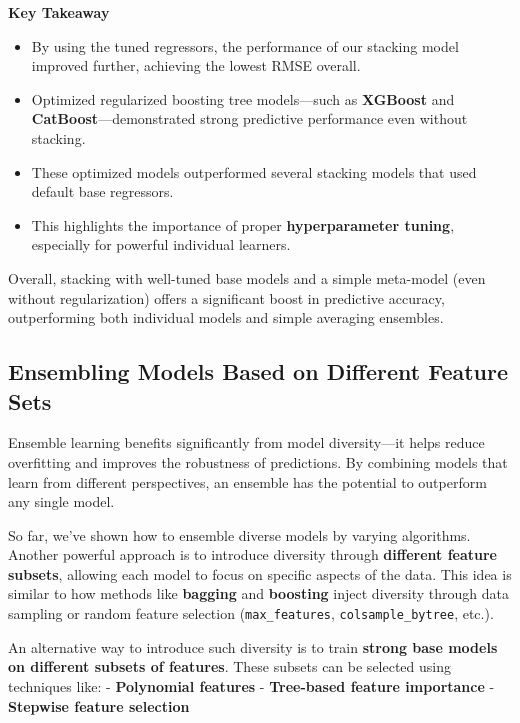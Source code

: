 \documentclass[
  letterpaper,
  DIV=11,
  numbers=noendperiod]{scrreprt}
\providecommand{\tightlist}{%
  \setlength{\itemsep}{0pt}\setlength{\parskip}{0pt}}\usepackage{longtable,booktabs,array}
\begin{document}
\textbf{Key Takeaway}

\begin{itemize}
\tightlist
\item
  By using the tuned regressors, the performance of our stacking model
  improved further, achieving the lowest RMSE overall.
\item
  Optimized regularized boosting tree models---such as \textbf{XGBoost}
  and \textbf{CatBoost}---demonstrated strong predictive performance
  even without stacking.
\item
  These optimized models outperformed several stacking models that used
  default base regressors.
\item
  This highlights the importance of proper \textbf{hyperparameter
  tuning}, especially for powerful individual learners.
\end{itemize}

Overall, stacking with well-tuned base models and a simple meta-model
(even without regularization) offers a significant boost in predictive
accuracy, outperforming both individual models and simple averaging
ensembles.

\subsection{Ensembling Models Based on Different Feature
Sets}\label{ensembling-models-based-on-different-feature-sets}

Ensemble learning benefits significantly from model diversity---it helps
reduce overfitting and improves the robustness of predictions. By
combining models that learn from different perspectives, an ensemble has
the potential to outperform any single model.

So far, we've shown how to ensemble diverse models by varying
algorithms. Another powerful approach is to introduce diversity through
\textbf{different feature subsets}, allowing each model to focus on
specific aspects of the data. This idea is similar to how methods like
\textbf{bagging} and \textbf{boosting} inject diversity through data
sampling or random feature selection (\texttt{max\_features},
\texttt{colsample\_bytree}, etc.).

An alternative way to introduce such diversity is to train
\textbf{strong base models on different subsets of features}. These
subsets can be selected using techniques like: - \textbf{Polynomial
features} - \textbf{Tree-based feature importance} - \textbf{Stepwise
feature selection}
\end{document}
